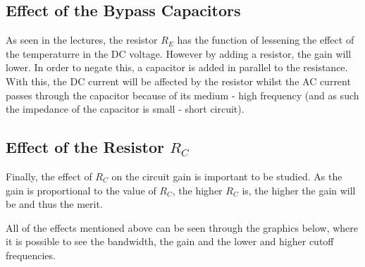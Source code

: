 \subsection{Effect of the Bypass Capacitors}

\par As seen in the lectures, the resistor $R_E$ has the function of lessening the effect of the temperaturre in the DC voltage. However by adding a resistor, the gain will lower. In order to negate this, a capacitor is added in parallel to the resistance. With this, the DC current will be affected by the resistor whilst the AC current passes through the capacitor because of its medium - high frequency (and as such the impedance of the capacitor is small - short circuit).

\subsection{Effect of the Resistor $R_C$}

\par Finally, the effect of $R_C$ on the circuit gain is important to be studied. As the gain is proportional to the value of $R_C$, the higher $R_C$ is, the higher the gain will be and thus the merit. 

\par All of the effects mentioned above can be seen through the graphics below, where it is possible to see the bandwidth, the gain and the lower and higher cutoff frequencies.

